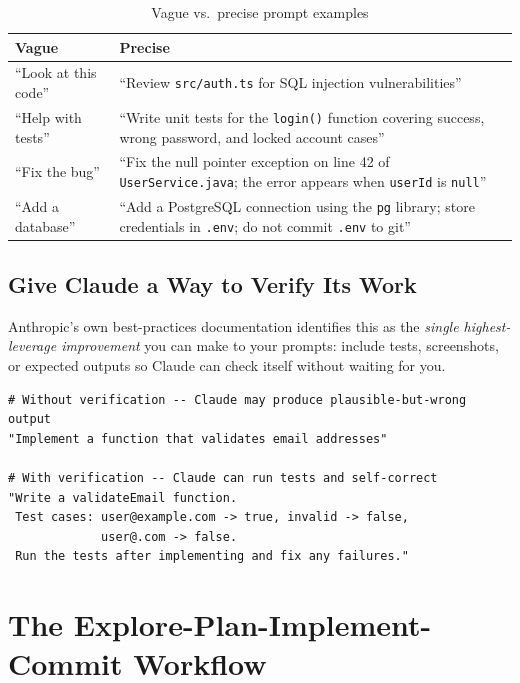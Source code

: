 \begin{table}[ht]
\centering
\caption{Vague vs.\ precise prompt examples}
\label{tab:prompt-examples}
\begin{tabularx}{\textwidth}{lX}
\toprule
\textbf{Vague} & \textbf{Precise} \\
\midrule
``Look at this code'' & ``Review \texttt{src/auth.ts} for SQL injection vulnerabilities'' \\
``Help with tests''  & ``Write unit tests for the \texttt{login()} function covering success, wrong password, and locked account cases'' \\
``Fix the bug''      & ``Fix the null pointer exception on line 42 of \texttt{UserService.java}; the error appears when \texttt{userId} is \texttt{null}'' \\
``Add a database''   & ``Add a PostgreSQL connection using the \texttt{pg} library; store credentials in \texttt{.env}; do not commit \texttt{.env} to git'' \\
\bottomrule
\end{tabularx}
\end{table}

\subsection{Give Claude a Way to Verify Its Work}

Anthropic's own best-practices documentation identifies this as the
\emph{single highest-leverage improvement} you can make to your prompts:
include tests, screenshots, or expected outputs so Claude can check itself
without waiting for you.

\begin{lstlisting}[caption={Prompt without vs.\ with verification criteria}]
# Without verification -- Claude may produce plausible-but-wrong output
"Implement a function that validates email addresses"

# With verification -- Claude can run tests and self-correct
"Write a validateEmail function.
 Test cases: user@example.com -> true, invalid -> false,
             user@.com -> false.
 Run the tests after implementing and fix any failures."
\end{lstlisting}

\section{The Explore-Plan-Implement-Commit Workflow}
\label{sec:epi-workflow}

